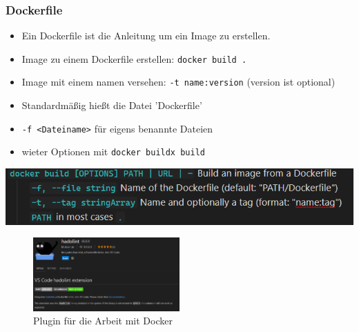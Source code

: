 \documentclass[22pt,handout]{beamer}
\newcommand{\code}[1]{\colorbox{gray!10}{\texttt{#1}}}
\begin{document}
\begin{frame}[fragile]
    \frametitle{Dockerfile}
    \begin{itemize}
        \item Ein Dockerfile ist die Anleitung um ein Image zu erstellen.
        \item Image zu einem Dockerfile erstellen: \code{docker build .}
        \item Image mit einem namen versehen: \code{-t name:version} (version ist optional)
        \item Standardmäßig hießt die Datei 'Dockerfile'
        \item \code{-f <Dateiname>} für eigens benannte Dateien
        \item wieter Optionen mit \code{docker buildx build}
    \end{itemize}
    \includegraphics{Bilder/Docker build.png}
    
    \begin{figure}[h]
        \centering
        \includegraphics[width=0.5\textwidth]{Bilder/Hadolint.png}
        \caption{Plugin für die Arbeit mit Docker}
    \end{figure}

\end{frame}
\end{document}
